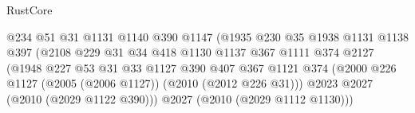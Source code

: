 \begin{lexlean}{RustCore}
\begin{coremodule}
                                              @234
                                              @51
                                              @31
                                              @1131
                                              @1140
                                              @390
                                              @1147
                                              (@1935
                                                @230
                                                @35
                                                @1938
                                                @1131
                                                @1138
                                                @397
                                                (@2108
                                                  @229
                                                  @31
                                                  @34
                                                  @418
                                                  @1130
                                                  @1137
                                                  @367
                                                  @1111
                                                  @374
                                                  @2127
                                                  (@1948
                                                    @227
                                                    @53
                                                    @31
                                                    @33
                                                    @1127
                                                    @390
                                                    @407
                                                    @367
                                                    @1121
                                                    @374
                                                    (@2000
                                                      @226
                                                      @1127
                                                      (@2005 (@2006 @1127))
                                                      (@2010 (@2012 @226 @31)))
                                                    @2023
                                                    @2027
                                                    (@2010 (@2029 @1122 @390)))
                                                  @2027
                                                  (@2010 (@2029 @1112 @1130)))

\end{coremodule}
\end{lexlean}
